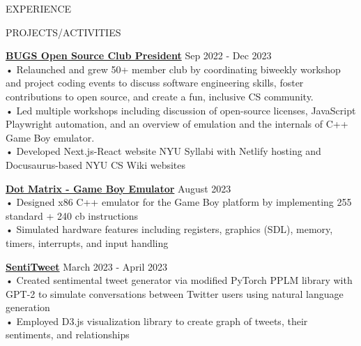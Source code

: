 \documentclass{resume} %
\begin{document}
\begin{rSection}{EXPERIENCE}
\end{rSection} 


\begin{rSection}{PROJECTS/ACTIVITIES}

\textbf{\href{https://bugs-nyu.github.io/}{BUGS Open Source Club President}} \hfill Sep 2022 - Dec 2023 \\
• Relaunched and grew 50+ member club by coordinating biweekly workshop and project coding events to discuss software engineering skills, foster contributions to open source, and create a fun, inclusive CS community.\\
• Led multiple workshops including discussion of open-source licenses, JavaScript Playwright automation, and an overview of emulation and the internals of C++ Game Boy emulator.\\
• Developed Next.js-React website NYU Syllabi with Netlify hosting and Docusaurus-based NYU CS Wiki websites

\textbf{\href{https://github.com/aminoa/dot-matrix}{Dot Matrix - Game Boy Emulator}} \hfill August 2023 \\
• Designed x86 C++ emulator for the Game Boy platform by implementing 255 standard + 240 cb instructions \\
• Simulated hardware features including registers, graphics (SDL), memory, timers, interrupts, and input handling 

\textbf {\href{https://github.com/aminoa/sentitweet/}{SentiTweet}} \hfill March 2023 - April 2023 \\
• Created sentimental tweet generator via modified PyTorch PPLM library with GPT-2 to simulate conversations between Twitter users using natural language generation\\
• Employed D3.js visualization library to create graph of tweets, their sentiments, and relationships 


\end{rSection}
\end{document}
